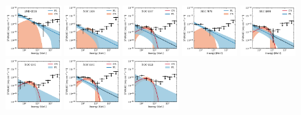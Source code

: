 \documentclass[doublespace,nopageskip]{VTthesis}
\begin{document}
\begin{appendices}
\begin{figure}
\centering
\includegraphics[width=0.19\textwidth]{Figures/Globular/spectra/2comp_0.pdf}
\includegraphics[width=0.19\textwidth]{Figures/Globular/spectra/2comp_4.pdf}
\includegraphics[width=0.19\textwidth]{Figures/Globular/spectra/2comp_16.pdf}
\includegraphics[width=0.19\textwidth]{Figures/Globular/spectra/2comp_26.pdf}
\includegraphics[width=0.19\textwidth]{Figures/Globular/spectra/2comp_7.pdf}
\includegraphics[width=0.19\textwidth]{Figures/Globular/spectra/2comp_14.pdf}
\includegraphics[width=0.19\textwidth]{Figures/Globular/spectra/2comp_21.pdf}
\includegraphics[width=0.19\textwidth]{Figures/Globular/spectra/2comp_20.pdf}

\end{figure}
\end{appendices}
\end{document}
